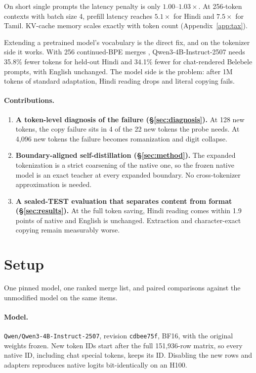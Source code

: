 \documentclass[11pt]{article}
\begin{document}
On short single prompts the latency penalty is only $1.00$--$1.03\times$. At 256-token contexts with batch size 4, prefill latency reaches $5.1\times$ for Hindi and $7.5\times$ for Tamil. KV-cache memory scales exactly with token count (Appendix~\ref{app:tax}).

Extending a pretrained model's vocabulary is the direct fix, and on the tokenizer side it works. With 256 continued-BPE merges \citep{sennrich2016bpe}, Qwen3-4B-Instruct-2507 \citep{yang2025qwen3} needs 35.8\% fewer tokens for held-out Hindi and 34.1\% fewer for chat-rendered Belebele prompts, with English unchanged. The model side is the problem: after 1M tokens of standard adaptation, Hindi reading drops and literal copying fails.

\paragraph{Contributions.}
\begin{enumerate}
  \item \textbf{A token-level diagnosis of the failure (\S\ref{sec:diagnosis}).} At 128 new tokens, the copy failure sits in 4 of the 22 new tokens the probe needs. At 4,096 new tokens the failure becomes romanization and digit collapse.
  \item \textbf{Boundary-aligned self-distillation (\S\ref{sec:method}).} The expanded tokenization is a strict coarsening of the native one, so the frozen native model is an exact teacher at every expanded boundary. No cross-tokenizer approximation is needed.
  \item \textbf{A sealed-TEST evaluation that separates content from format (\S\ref{sec:results}).} At the full token saving, Hindi reading comes within 1.9 points of native and English is unchanged. Extraction and character-exact copying remain measurably worse.
\end{enumerate}

\section{Setup}
\label{sec:setup}

One pinned model, one ranked merge list, and paired comparisons against the unmodified model on the same items.

\paragraph{Model.} \texttt{Qwen/Qwen3-4B-Instruct-2507}, revision \texttt{cdbee75f}, BF16, with the original weights frozen. New token IDs start after the full 151,936-row matrix, so every native ID, including chat special tokens, keeps its ID. Disabling the new rows and adapters reproduces native logits bit-identically on an H100.
\end{document}
